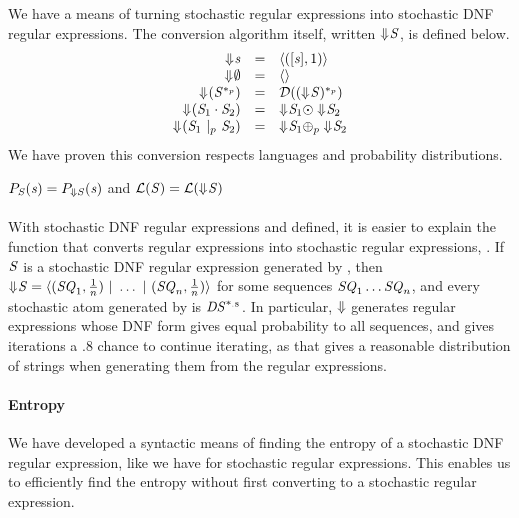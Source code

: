 \documentclass[acmsmall,screen,anonymous]{acmart}
\begin{document}
We have a means of turning stochastic regular expressions into stochastic DNF
regular expressions. The conversion algorithm itself, written
$\Downarrow\mkern-4mu \mathit{S}$, is defined below.
\[
  \begin{array}{rcl}
    \ToDNFRegexOf{\String} & = & \DNFOf{(\SequenceOf{\String},1)}\\
    \ToDNFRegexOf{\emptyset} & = & \DNFOf{}\\
    \ToDNFRegexOf{(\PRegexStar{\Regex}{\Probability})} & = & \AtomToDNFOf{\PRegexStar{(\ToDNFRegexOf{\Regex})}{\Probability}}\\
    \ToDNFRegexOf{(\RegexConcat{\Regex_1}{\Regex_2})} & = & \ToDNFRegexOf{\Regex_1} \ConcatDNF \ToDNFRegexOf{\Regex_2}\\
    \ToDNFRegexOf{(\PRegexOr{\Regex_1}{\Regex_2}{\Probability})} & = & \ToDNFRegexOf{\Regex_1} \OrDNF_{\Probability} \ToDNFRegexOf{\Regex_2}\\
  \end{array}
\]
We have proven this conversion respects languages and probability
distributions.

\begin{theorem}
  $P_{\mathit{S}}(\mathit{s}) = P_{\Downarrow
    \mathit{S}}(\mathit{s})$ and $\mathcal{L}(\mathit{S}) =
  \mathcal{L}(\Downarrow\mkern-4mu \mathit{S})$
\end{theorem}

\paragraph*{\ToStochastic} With stochastic DNF regular expressions and
\ToDNFRegex defined, it is easier to explain the function that converts regular
expressions into stochastic regular expressions, \ToStochastic. If $\mathit{S}$ is a
stochastic DNF regular expression generated by \ToStochastic, then
$\Downarrow\mkern-4mu \mathit{S} = \langle(\mathit{SQ}_1,\frac{1}{n}) ~|~ \ldots ~|~
  (\mathit{SQ}_n,\frac{1}{n})\rangle$ for some sequences $\mathit{SQ}_1\ldots\mathit{SQ}_n$,
and every stochastic atom generated by \ToStochastic is
$\mathit{DS}^{*_{.8}}$. In particular, $\Downarrow$ generates regular
expressions whose DNF form gives equal probability to all sequences, and gives
iterations a .8 chance to continue iterating, as that gives a reasonable
distribution of strings when generating them from the regular expressions.

\paragraph*{Entropy}
We have developed a syntactic means of finding the entropy of a stochastic DNF
regular expression, like we have for stochastic regular expressions.  This
enables us to efficiently find the entropy without first converting to a
stochastic regular expression.
\end{document}
